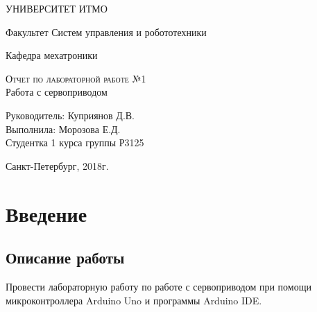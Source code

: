 \documentclass[12pt,a4paper]{scrartcl}
\begin{document}
\begin{titlepage}
  \begin{center}
    \large
 
    УНИВЕРСИТЕТ ИТМО
    \vspace{0.25cm}
     
    Факультет Систем управления и робототехники
     
    Кафедра мехатроники
    \vfill
 
    \textsc{Отчет по лабораторной работе №1}\\[5mm]
     
    {\LARGE Работа с сервоприводом}

\end{center}
\vfill
 
\newlength{\ML}
\hfill\begin{minipage}{0.4\textwidth}
  Руководитель: Куприянов Д.В.\\
  Выполнила: Морозова Е.Д. \\
  Студентка 1 курса группы Р3125\\
  
  
\end{minipage}%
\bigskip

 
\begin{center}
  Санкт-Петербург, 2018г.
\end{center}
\end{titlepage}

\begin{tableofcontents}
\end{tableofcontents}
    \newpage
    
\section{Введение}

\label{sec:intro}
 

\subsection{Описание работы}
Провести лабораторную работу по работе с сервоприводом при помощи микроконтроллера Arduino Uno и программы Arduino IDE.\\
\\
\end{document}
